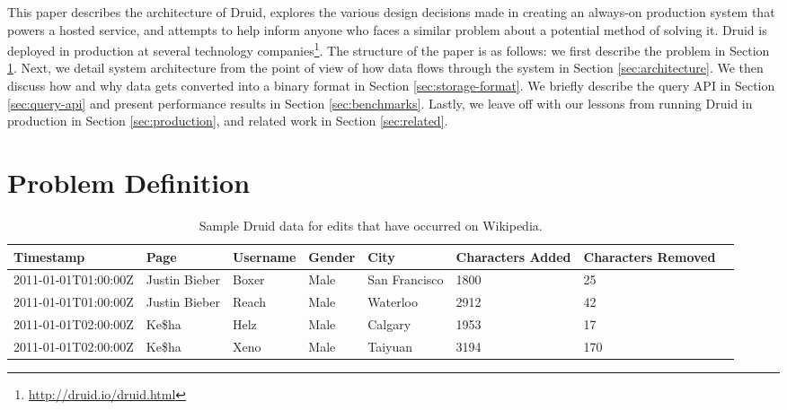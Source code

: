 \documentclass{sig-alternate-2013}
\begin{document}
This paper describes the architecture of Druid, explores the various design
decisions made in creating an always-on production system that powers a hosted
service, and attempts to help inform anyone who faces a similar problem about a
potential method of solving it. Druid is deployed in production at several
technology
companies\footnote{\href{http://druid.io/druid.html}{http://druid.io/druid.html}}.
The structure of the paper is as follows: we first describe the problem in
Section \ref{sec:problem-definition}. Next, we detail system architecture from
the point of view of how data flows through the system in Section
\ref{sec:architecture}. We then discuss how and why data gets converted into a
binary format in Section \ref{sec:storage-format}. We briefly describe the
query API in Section \ref{sec:query-api} and present performance results
in Section \ref{sec:benchmarks}. Lastly, we leave off with our lessons from
running Druid in production in Section \ref{sec:production}, and related work
in Section \ref{sec:related}.

\section{Problem Definition}
\label{sec:problem-definition}

\begin{table*}
  \centering
  \begin{tabular}{| l | l | l | l | l | l | l | l |}
    \hline
    \textbf{Timestamp} & \textbf{Page} & \textbf{Username} & \textbf{Gender} & \textbf{City} & \textbf{Characters Added} & \textbf{Characters Removed} \\ \hline
    2011-01-01T01:00:00Z & Justin Bieber & Boxer & Male & San Francisco & 1800 & 25 \\ \hline
    2011-01-01T01:00:00Z & Justin Bieber & Reach & Male & Waterloo & 2912 & 42 \\ \hline
    2011-01-01T02:00:00Z & Ke\$ha & Helz & Male & Calgary & 1953 & 17 \\ \hline
    2011-01-01T02:00:00Z & Ke\$ha & Xeno & Male & Taiyuan & 3194 & 170 \\ \hline
  \end{tabular}
  \caption{Sample Druid data for edits that have occurred on Wikipedia.}
  \label{tab:sample_data}
\end{table*}
\end{document}
